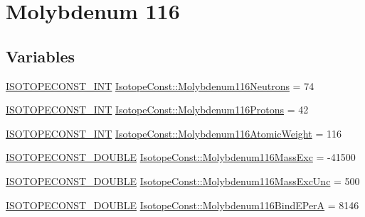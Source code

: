 \hypertarget{group___isotope_const-_molybdenum-_mo116}{}\section{Molybdenum 116}
\label{group___isotope_const-_molybdenum-_mo116}
\subsection*{Variables}
\begin{DoxyCompactItemize}
\item 
\mbox{\hyperlink{group___isotope_const-_macros_ga5f18360b3e99483a35c32d789e62621c}{I\+S\+O\+T\+O\+P\+E\+C\+O\+N\+S\+T\+\_\+\+I\+NT}} \mbox{\hyperlink{group___isotope_const-_molybdenum-_mo116_ga10a2ff592a86814ac973d01f1f9a413e}{Isotope\+Const\+::\+Molybdenum116\+Neutrons}} = 74
\item 
\mbox{\hyperlink{group___isotope_const-_macros_ga5f18360b3e99483a35c32d789e62621c}{I\+S\+O\+T\+O\+P\+E\+C\+O\+N\+S\+T\+\_\+\+I\+NT}} \mbox{\hyperlink{group___isotope_const-_molybdenum-_mo116_gaf7d1631cc40f42c36d7a3e302626c304}{Isotope\+Const\+::\+Molybdenum116\+Protons}} = 42
\item 
\mbox{\hyperlink{group___isotope_const-_macros_ga5f18360b3e99483a35c32d789e62621c}{I\+S\+O\+T\+O\+P\+E\+C\+O\+N\+S\+T\+\_\+\+I\+NT}} \mbox{\hyperlink{group___isotope_const-_molybdenum-_mo116_gaa79f6f5652e14e84c4d6b27f9eda44ac}{Isotope\+Const\+::\+Molybdenum116\+Atomic\+Weight}} = 116
\item 
\mbox{\hyperlink{group___isotope_const-_macros_ga8f45a7272ce02c0b4c65c44636ed719a}{I\+S\+O\+T\+O\+P\+E\+C\+O\+N\+S\+T\+\_\+\+D\+O\+U\+B\+LE}} \mbox{\hyperlink{group___isotope_const-_molybdenum-_mo116_ga3b568523b965f40df7a47bafbc2fa670}{Isotope\+Const\+::\+Molybdenum116\+Mass\+Exc}} = -\/41500
\item 
\mbox{\hyperlink{group___isotope_const-_macros_ga8f45a7272ce02c0b4c65c44636ed719a}{I\+S\+O\+T\+O\+P\+E\+C\+O\+N\+S\+T\+\_\+\+D\+O\+U\+B\+LE}} \mbox{\hyperlink{group___isotope_const-_molybdenum-_mo116_ga483d5070289878da7dfd743b2ff50816}{Isotope\+Const\+::\+Molybdenum116\+Mass\+Exc\+Unc}} = 500
\item 
\mbox{\hyperlink{group___isotope_const-_macros_ga8f45a7272ce02c0b4c65c44636ed719a}{I\+S\+O\+T\+O\+P\+E\+C\+O\+N\+S\+T\+\_\+\+D\+O\+U\+B\+LE}} \mbox{\hyperlink{group___isotope_const-_molybdenum-_mo116_ga6737e62d4c4eeffe791c37023708555a}{Isotope\+Const\+::\+Molybdenum116\+Bind\+E\+PerA}} = 8146
\item 

\end{DoxyCompactItemize}
